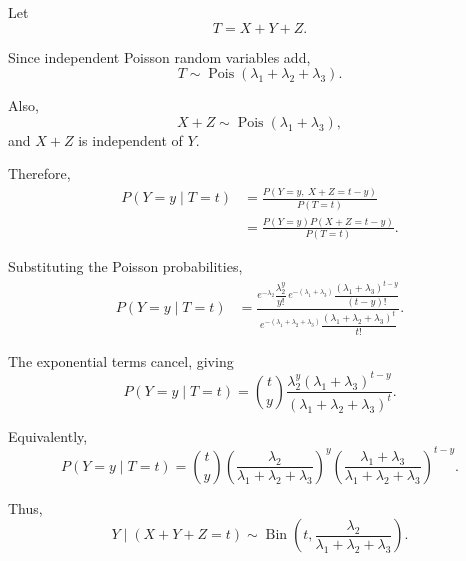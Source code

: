 \documentclass[11pt]{article}
\newenvironment{solution}{
    \par
    \begin{tcolorbox}[
        colback=white,
        colframe=uwgold,
        boxrule=0.7pt,
        arc=2mm,
        left=3mm,
        right=3mm,
        top=2mm,
        bottom=2mm,
        breakable,
        before skip=0.5em,
        after skip=1em,
        title=\textbf{Solution},
        coltitle=uwpurple,
        fonttitle=\bfseries
    ]
}{
    \end{tcolorbox}
}
\begin{document}
\begin{solution}

Let
\[
T=X+Y+Z.
\]

Since independent Poisson random variables add,
\[
T
\sim
\operatorname{Pois}
(\lambda_1+\lambda_2+\lambda_3).
\]

Also,
\[
X+Z
\sim
\operatorname{Pois}(\lambda_1+\lambda_3),
\]
and \(X+Z\) is independent of \(Y\).

Therefore,
\[
\begin{aligned}
P(Y=y\mid T=t)
&=
\frac{
P(Y=y,\ X+Z=t-y)
}{
P(T=t)
}\\
&=
\frac{
P(Y=y)
P(X+Z=t-y)
}{
P(T=t)
}.
\end{aligned}
\]

Substituting the Poisson probabilities,
\[
\begin{aligned}
P(Y=y\mid T=t)
&=
\frac{
e^{-\lambda_2}
\dfrac{\lambda_2^y}{y!}
\,
e^{-(\lambda_1+\lambda_3)}
\dfrac{(\lambda_1+\lambda_3)^{t-y}}{(t-y)!}
}{
e^{-(\lambda_1+\lambda_2+\lambda_3)}
\dfrac{
(\lambda_1+\lambda_2+\lambda_3)^t
}{t!}
}.
\end{aligned}
\]

The exponential terms cancel, giving
\[
P(Y=y\mid T=t)
=
\binom ty
\frac{
\lambda_2^y
(\lambda_1+\lambda_3)^{t-y}
}{
(\lambda_1+\lambda_2+\lambda_3)^t
}.
\]

Equivalently,
\[
P(Y=y\mid T=t)
=
\binom ty
\left(
\frac{\lambda_2}
{\lambda_1+\lambda_2+\lambda_3}
\right)^y
\left(
\frac{\lambda_1+\lambda_3}
{\lambda_1+\lambda_2+\lambda_3}
\right)^{t-y}.
\]

Thus,
\[
Y\mid(X+Y+Z=t)
\sim
\operatorname{Bin}
\left(
t,
\frac{\lambda_2}
{\lambda_1+\lambda_2+\lambda_3}
\right).
\]

\end{solution}



\newpage%
\end{document}
